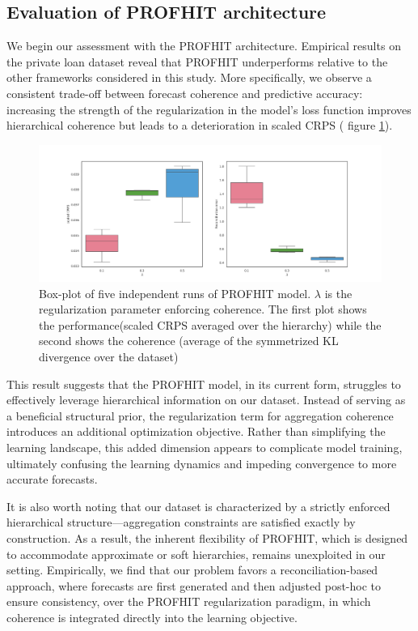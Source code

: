 \documentclass[letterpaper]{article}
\begin{document}
\subsection{Evaluation of PROFHIT architecture}

We begin our assessment with the PROFHIT architecture. Empirical results on the private loan dataset reveal that PROFHIT underperforms relative to the other frameworks considered in this study. More specifically, we observe a consistent trade-off between forecast coherence and predictive accuracy: increasing the strength of the regularization in the model's loss function improves hierarchical coherence but leads to a deterioration in scaled CRPS ( figure \ref{fig:PROFHIT}).

\begin{figure}
    \centering
    \includegraphics[width=\linewidth]{reconciliation_error.png}
    \caption{Box-plot of five independent runs of PROFHIT model. $\lambda$ is the regularization parameter enforcing coherence. The first plot shows the performance(scaled CRPS averaged over the hierarchy) while the second shows the coherence (average of the symmetrized KL divergence over the dataset)}
    \label{fig:PROFHIT}
\end{figure}

This result suggests that the PROFHIT model, in its current form, struggles to effectively leverage hierarchical information on our dataset. Instead of serving as a beneficial structural prior, the regularization term for aggregation coherence introduces an additional optimization objective. Rather than simplifying the learning landscape, this added dimension appears to complicate model training, ultimately confusing the learning dynamics and impeding convergence to more accurate forecasts.

It is also worth noting that our dataset is characterized by a strictly enforced hierarchical structure—aggregation constraints are satisfied exactly by construction. As a result, the inherent flexibility of PROFHIT, which is designed to accommodate approximate or soft hierarchies, remains unexploited in our setting. Empirically, we find that our problem favors a reconciliation-based approach, where forecasts are first generated and then adjusted post-hoc to ensure consistency, over the PROFHIT regularization paradigm, in which coherence is integrated directly into the learning objective.
\end{document}
